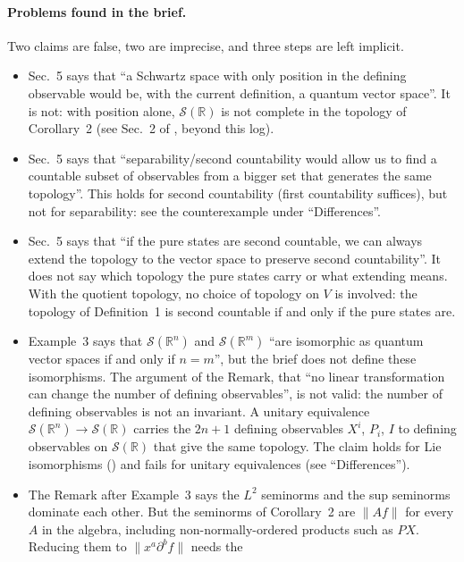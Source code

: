 \documentclass[11pt]{article}
\begin{document}
\paragraph{Problems found in the brief.} Two claims are false, two are imprecise, and three steps
are left implicit.
\begin{itemize}
\item Sec.~5 says that ``a Schwartz space with only position in the defining observable would
  be, with the current definition, a quantum vector space''. It is not: with position alone,
  $\mathcal{S}(\mathbb{R})$ is not complete in the topology of Corollary~2 (see Sec.~2 of
  , beyond this log).
\item Sec.~5 says that ``separability/second countability would allow us to find a countable
  subset of observables from a bigger set that generates the same topology''. This holds for
  second countability (first countability suffices), but not for separability: see the
  counterexample under ``Differences''.
\item Sec.~5 says that ``if the pure states are second countable, we can always extend the
  topology to the vector space to preserve second countability''. It does not say which
  topology the pure states carry or what extending means. With the quotient topology, no choice
  of topology on $V$ is involved: the topology of Definition~1 is second countable if and only
  if the pure states are.
\item Example~3 says that $\mathcal{S}(\mathbb{R}^n)$ and $\mathcal{S}(\mathbb{R}^m)$ ``are
  isomorphic as quantum vector spaces if and only if $n = m$'', but the brief does not define
  these isomorphisms. The argument of the Remark, that ``no linear transformation can change the
  number of defining observables'', is not valid: the number of defining observables is not an
  invariant. A unitary equivalence $\mathcal{S}(\mathbb{R}^n) \to \mathcal{S}(\mathbb{R})$ carries
  the $2n + 1$ defining observables $X^i$, $P_i$, $I$ to defining observables on
  $\mathcal{S}(\mathbb{R})$ that give the same topology. The claim holds for Lie isomorphisms
  () and fails for unitary equivalences (see
  ``Differences'').
\item The Remark after Example~3 says the $L^2$ seminorms and the sup seminorms dominate each
  other. But the seminorms of Corollary~2 are $\|Af\|$ for every $A$ in the algebra, including
  non-normally-ordered products such as $PX$. Reducing them to $\|x^a \partial^b f\|$ needs the

\end{itemize}
\end{document}
